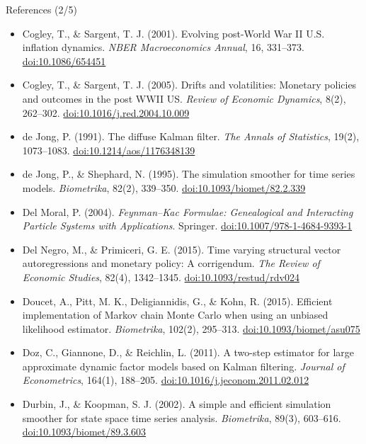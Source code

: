 \begin{frame}{References (2/5)}
\itemsize{\tiny}
\begin{itemize}
    \item Cogley, T., \& Sargent, T. J. (2001). Evolving post-World War II U.S. inflation dynamics. \textit{NBER Macroeconomics Annual}, 16, 331--373. \href{https://doi.org/10.1086/654451}{doi:10.1086/654451}
    \item Cogley, T., \& Sargent, T. J. (2005). Drifts and volatilities: Monetary policies and outcomes in the post WWII US. \textit{Review of Economic Dynamics}, 8(2), 262--302. \href{https://doi.org/10.1016/j.red.2004.10.009}{doi:10.1016/j.red.2004.10.009}
    \item de Jong, P. (1991). The diffuse Kalman filter. \textit{The Annals of Statistics}, 19(2), 1073--1083. \href{https://doi.org/10.1214/aos/1176348139}{doi:10.1214/aos/1176348139}
    \item de Jong, P., \& Shephard, N. (1995). The simulation smoother for time series models. \textit{Biometrika}, 82(2), 339--350. \href{https://doi.org/10.1093/biomet/82.2.339}{doi:10.1093/biomet/82.2.339}
    \item Del Moral, P. (2004). \textit{Feynman--Kac Formulae: Genealogical and Interacting Particle Systems with Applications}. Springer. \href{https://doi.org/10.1007/978-1-4684-9393-1}{doi:10.1007/978-1-4684-9393-1}
    \item Del Negro, M., \& Primiceri, G. E. (2015). Time varying structural vector autoregressions and monetary policy: A corrigendum. \textit{The Review of Economic Studies}, 82(4), 1342--1345. \href{https://doi.org/10.1093/restud/rdv024}{doi:10.1093/restud/rdv024}
    \item Doucet, A., Pitt, M. K., Deligiannidis, G., \& Kohn, R. (2015). Efficient implementation of Markov chain Monte Carlo when using an unbiased likelihood estimator. \textit{Biometrika}, 102(2), 295--313. \href{https://doi.org/10.1093/biomet/asu075}{doi:10.1093/biomet/asu075}
    \item Doz, C., Giannone, D., \& Reichlin, L. (2011). A two-step estimator for large approximate dynamic factor models based on Kalman filtering. \textit{Journal of Econometrics}, 164(1), 188--205. \href{https://doi.org/10.1016/j.jeconom.2011.02.012}{doi:10.1016/j.jeconom.2011.02.012}
    \item Durbin, J., \& Koopman, S. J. (2002). A simple and efficient simulation smoother for state space time series analysis. \textit{Biometrika}, 89(3), 603--616. \href{https://doi.org/10.1093/biomet/89.3.603}{doi:10.1093/biomet/89.3.603}

\end{itemize}
\end{frame}
